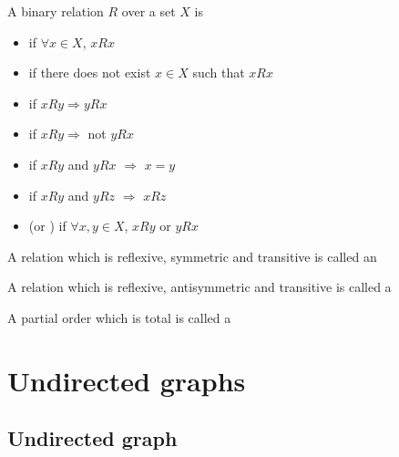 \documentclass[aspectratio=43]{beamer}
\begin{document}
\begin{frame}
	\begin{definition}
		A binary relation $R$ over a set $X$ is
	\begin{itemize}
	\item {} if $\forall x\in X$, $xRx$
	\item {} if there does not exist $x\in X$ such that $xRx$
	\item {} if $xRy \Rightarrow yRx$
	\item {} if $xRy \Rightarrow $ not $y R x$
	\item {} if $xRy$ and $yRx$ $\Rightarrow$ $x=y$
	\item {} if $xRy$ and $yRz$ $\Rightarrow$  $xRz$
	\item {} (or ) if $\forall x, y\in X$, $x R y$ or $y R x$
	\end{itemize}
	\end{definition}
\end{frame}
	
	
\begin{frame} 
	\begin{definition}
	 A relation which is reflexive, symmetric and transitive is called an 
	\end{definition}
	\vfill
	\begin{definition}
	 A relation which is reflexive, antisymmetric and transitive is called a 
	\end{definition}
	\vfill
	\begin{definition}
	A partial order which is total is called a 
	\end{definition}
\end{frame}
	



\section{Undirected graphs}


\subsection{Undirected graph}
\end{document}
